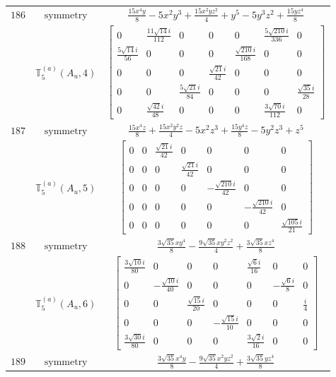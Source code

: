 \documentclass[fleqn,8pt,landscape]{jsarticle}
\begin{document}
\begin{longtable}{ccc}
$ 186 $ & $ \text{symmetry} $ & $ \frac{15 x^{4} y}{8} - 5 x^{2} y^{3} + \frac{15 x^{2} y z^{2}}{4} + y^{5} - 5 y^{3} z^{2} + \frac{15 y z^{4}}{8} $ \\
$  $ & $ \mathbb{T}_{5}^{(a)}(A_{u},4) $ & $ \begin{bmatrix} 0 & \frac{11 \sqrt{14} i}{112} & 0 & 0 & 0 & \frac{5 \sqrt{210} i}{336} & 0 \\ \frac{5 \sqrt{14} i}{56} & 0 & 0 & 0 & \frac{\sqrt{210} i}{168} & 0 & 0 \\ 0 & 0 & 0 & \frac{\sqrt{21} i}{42} & 0 & 0 & 0 \\ 0 & 0 & \frac{5 \sqrt{21} i}{84} & 0 & 0 & 0 & \frac{\sqrt{35} i}{28} \\ 0 & \frac{\sqrt{42} i}{48} & 0 & 0 & 0 & \frac{3 \sqrt{70} i}{112} & 0 \end{bmatrix} $ \\ \hline
$ 187 $ & $ \text{symmetry} $ & $ \frac{15 x^{4} z}{8} + \frac{15 x^{2} y^{2} z}{4} - 5 x^{2} z^{3} + \frac{15 y^{4} z}{8} - 5 y^{2} z^{3} + z^{5} $ \\
$  $ & $ \mathbb{T}_{5}^{(a)}(A_{u},5) $ & $ \begin{bmatrix} 0 & 0 & \frac{\sqrt{21} i}{42} & 0 & 0 & 0 & 0 \\ 0 & 0 & 0 & \frac{\sqrt{21} i}{42} & 0 & 0 & 0 \\ 0 & 0 & 0 & 0 & - \frac{\sqrt{210} i}{42} & 0 & 0 \\ 0 & 0 & 0 & 0 & 0 & - \frac{\sqrt{210} i}{42} & 0 \\ 0 & 0 & 0 & 0 & 0 & 0 & \frac{\sqrt{105} i}{21} \end{bmatrix} $ \\ \hline
$ 188 $ & $ \text{symmetry} $ & $ \frac{3 \sqrt{35} x y^{4}}{8} - \frac{9 \sqrt{35} x y^{2} z^{2}}{4} + \frac{3 \sqrt{35} x z^{4}}{8} $ \\
$  $ & $ \mathbb{T}_{5}^{(a)}(A_{u},6) $ & $ \begin{bmatrix} \frac{3 \sqrt{10} i}{80} & 0 & 0 & 0 & \frac{\sqrt{6} i}{16} & 0 & 0 \\ 0 & - \frac{\sqrt{10} i}{40} & 0 & 0 & 0 & - \frac{\sqrt{6} i}{8} & 0 \\ 0 & 0 & \frac{\sqrt{15} i}{20} & 0 & 0 & 0 & \frac{i}{4} \\ 0 & 0 & 0 & - \frac{\sqrt{15} i}{10} & 0 & 0 & 0 \\ \frac{3 \sqrt{30} i}{80} & 0 & 0 & 0 & \frac{3 \sqrt{2} i}{16} & 0 & 0 \end{bmatrix} $ \\ \hline
$ 189 $ & $ \text{symmetry} $ & $ \frac{3 \sqrt{35} x^{4} y}{8} - \frac{9 \sqrt{35} x^{2} y z^{2}}{4} + \frac{3 \sqrt{35} y z^{4}}{8} $ \\

\end{longtable}
\end{document}
